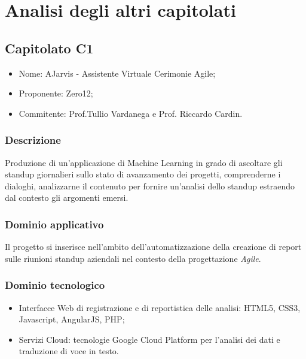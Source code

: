 \documentclass[openany,12pt,a4paper]{report}
\begin{document}
\chapter{Analisi degli altri capitolati}


\section{Capitolato C1}

\begin{itemize}
    \item{Nome:} AJarvis - Assistente Virtuale Cerimonie Agile;
    \item{Proponente:} Zero12;
    \item{Commitente:} Prof.Tullio Vardanega e Prof. Riccardo Cardin.
\end{itemize}

\subsection{Descrizione}

Produzione di un’applicazione di Machine Learning in grado di ascoltare gli standup giornalieri sullo stato di avanzamento dei progetti, comprenderne i dialoghi, analizzarne il contenuto per fornire un’analisi dello standup estraendo dal contesto gli argomenti emersi.

\subsection{Dominio applicativo}

Il progetto si inserisce nell'ambito dell'automatizzazione della creazione di report sulle riunioni standup aziendali nel contesto della progettazione \textit{Agile}.

\subsection{Dominio tecnologico}

\begin{itemize}
    \item{Interfacce Web di registrazione e di reportistica delle analisi:} HTML5, CSS3, Javascript, AngularJS, PHP;
    
    \item{Servizi Cloud:} tecnologie Google Cloud Platform per l’analisi dei dati e traduzione di voce in testo.
\end{itemize}
\end{document}
